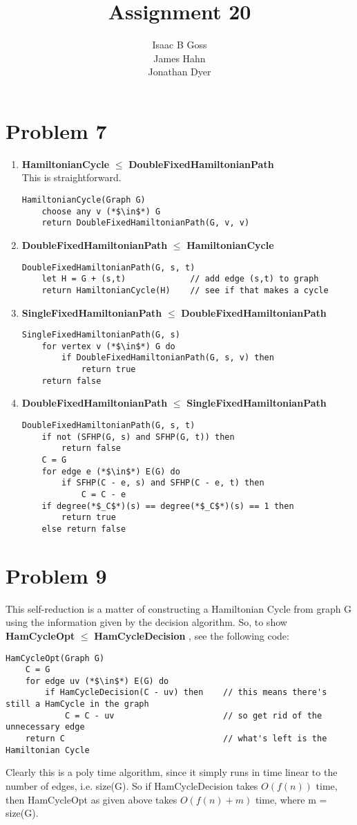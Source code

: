 \documentclass{article}
\author{Isaac B Goss\\ James Hahn\\ Jonathan Dyer}
\title{Assignment 20}
\providecommand{\prob}[1]{\section*{Problem #1}}
\providecommand{\reducible}[2]{
  \textbf{#1} $\leq$ \textbf{#2}
}
\begin{document}
\maketitle
\prob{7}
\begin{enumerate}
  \item \reducible{HamiltonianCycle}{DoubleFixedHamiltonianPath} \\
        This is straightforward.
  \begin{lstlisting}
HamiltonianCycle(Graph G)
    choose any v (*$\in$*) G
    return DoubleFixedHamiltonianPath(G, v, v)
  \end{lstlisting}

  \item \reducible{DoubleFixedHamiltonianPath}{HamiltonianCycle}
  \begin{lstlisting}
DoubleFixedHamiltonianPath(G, s, t)
    let H = G + (s,t)             // add edge (s,t) to graph
    return HamiltonianCycle(H)    // see if that makes a cycle
  \end{lstlisting}

  \item \reducible{SingleFixedHamiltonianPath}{DoubleFixedHamiltonianPath}
  \begin{lstlisting}
SingleFixedHamiltonianPath(G, s)
    for vertex v (*$\in$*) G do
        if DoubleFixedHamiltonianPath(G, s, v) then
            return true
    return false
  \end{lstlisting}

  \item \reducible{DoubleFixedHamiltonianPath}{SingleFixedHamiltonianPath}
  \begin{lstlisting}
DoubleFixedHamiltonianPath(G, s, t)
    if not (SFHP(G, s) and SFHP(G, t)) then
        return false
    C = G
    for edge e (*$\in$*) E(G) do
        if SFHP(C - e, s) and SFHP(C - e, t) then
            C = C - e
    if degree(*$_C$*)(s) == degree(*$_C$*)(s) == 1 then
        return true
    else return false

  \end{lstlisting}

\end{enumerate}

\prob{9}
This self-reduction is a matter of constructing a Hamiltonian Cycle from graph G using the information given by the decision algorithm.
So, to show \reducible{HamCycleOpt}{HamCycleDecision}, see the following code:
\begin{lstlisting}
HamCycleOpt(Graph G)
    C = G
    for edge uv (*$\in$*) E(G) do
        if HamCycleDecision(C - uv) then    // this means there's still a HamCycle in the graph
            C = C - uv                      // so get rid of the unnecessary edge
    return C                                // what's left is the Hamiltonian Cycle
\end{lstlisting}
Clearly this is a poly time algorithm, since it simply runs in time linear to the number of edges, i.e. size(G). So if HamCycleDecision takes $O(f(n))$ time, then HamCycleOpt as given above takes $O(f(n) + m)$ time, where m = size(G).
\end{document}

